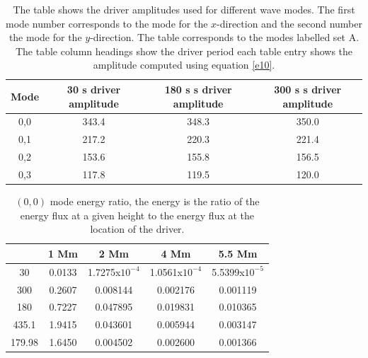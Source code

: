 \documentclass[preprint,authoryear,12pt]{elsarticle}
\begin{document}
\begin{table}\label{simamps}
\centering
\begin{tabular}{c c c c }
\hline
Mode   & 30 s driver amplitude & 180 s s driver amplitude & 300 s s driver amplitude\\
\hline
0,0 & 343.4 & 348.3 & 350.0 \\
\hline
0,1 & 217.2 & 220.3 & 221.4 \\
\hline
0,2 & 153.6 & 155.8 & 156.5 \\
\hline
0,3 & 117.8 & 119.5 & 120.0 \\
\hline
\end{tabular} 
\caption{The table shows the driver amplitudes used for different wave modes. The first mode number corresponds to the mode for the $x$-direction and the second number the mode for the $y$-direction. The table corresponds to the modes labelled set A. The table column headings show the driver period each table entry shows the amplitude computed using equation \ref{e10}.}
\label{Tableamps_30_180_300}
\end{table}






\begin{table}[h]
\centering
\begin{tabular}{c c c c c }
\hline
   &  1 Mm & 2 Mm & 4 Mm & 5.5 Mm \\
\hline
30 &  0.0133 & 1.7275x$10^{-4}$ & 1.0561x$10^{-4}$ & 5.5399x$10^{-5}$ \\
\hline
300 & 0.2607 & 0.008144 & 0.002176 &  0.001119 \\
\hline
180 & 0.7227 & 0.047895 & 0.019831 &  0.010365 \\
\hline
435.1 & 1.9415 & 0.043601 & 0.005944 & 0.003147  \\
\hline
179.98 & 1.6450 & 0.004502 & 0.002600&  0.001366 \\ 
\hline
\hline
\end{tabular} 
\caption{ $(0, 0)$ mode energy ratio, the energy is the ratio of the energy flux at a given height to the energy flux at the location of the driver.}
\label{Table00mode}
\end{table}
\end{document}
